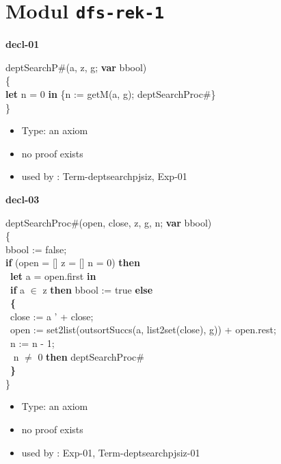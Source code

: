 \section{Modul \texttt{dfs-rek-1}}
\label{sec:dfs-rek-1}

{\parindent0cm

{\LARGE\bf decl-01}

\medskip

deptSearchP\#(a, z, g; {\bf var} bbool) \\
\{\\
{\bf let} n = 0 {\bf in} \{n := getM(a, g); deptSearchProc\#\}\\
\}

\begin{itemize}

\item Type: an axiom

\item       no proof exists
\item       used by      : Term-deptsearchpjsiz, Exp-01
\end{itemize}

\medskip

{\LARGE\bf decl-03}

\medskip

deptSearchProc\#(open, close, z, g, n; {\bf var} bbool) \\
\{\\
bbool := false;\\
 {\bf if} \Not (open = [] \Or z = [] \Or n = 0) {\bf then}\\
 \tabif\  {\bf let} a = open.first {\bf in}\\
 \tabif\ {\bf if} a $\in$ z {\bf then} bbool := true {\bf else}\\
 \tabif\  {\bf \{}\\
 \tabif\ \tabbe close := a ' + close;\\
 \tabif\ \tabbe open := set2list(outsortSuccs(a, list2set(close), g)) + open.rest;\\
 \tabif\ \tabbe n := n - 1;\\
 \tabif\  n $\neq$ 0 {\bf then} deptSearchProc\#\\
 \tabif\ {\bf \}}\\
\}

\begin{itemize}

\item Type: an axiom

\item       no proof exists
\item       used by      : Exp-01, Term-deptsearchpjsiz-01
\end{itemize}

}
